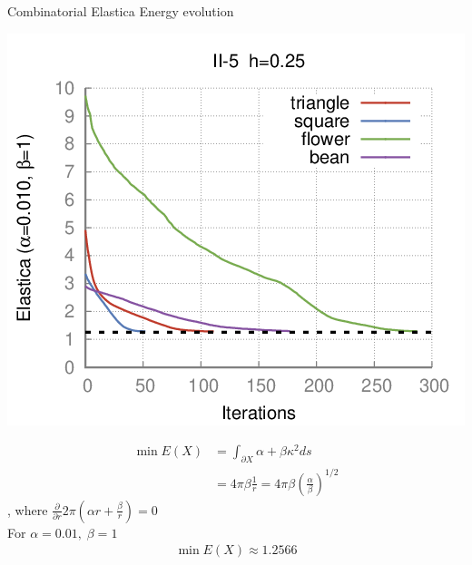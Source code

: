 \begin{frame}
	{Combinatorial Elastica}	
	{Energy evolution}

\begin{minipage}{0.49\textwidth}
\center
\includegraphics[scale=0.3]{figures/combinatorial-elastica/flow/ii/elastica/len_pen_0.01000/jonctions_1/curve_segs_4/best/gs_0.25000/summary-ii5.png}
\end{minipage}
\begin{minipage}{0.49\textwidth}
\begin{align*}
	\min E(X) &= \int_{\partial X}{ \alpha + \beta \kappa^2 ds}\\
	 &= 4\pi \beta \frac{1}{r} = 4\pi \beta \left(\frac{\alpha}{\beta}\right)^{1/2}
\end{align*}
, where $\frac{\partial }{\partial r} 2\pi(\alpha r + \frac{\beta}{r}) = 0$\\ 

%
For $\alpha=0.01,\; \beta=1$
%
\begin{align*}
	\min E(X) \approx 1.2566
\end{align*}
\end{minipage}
	
\end{frame}

